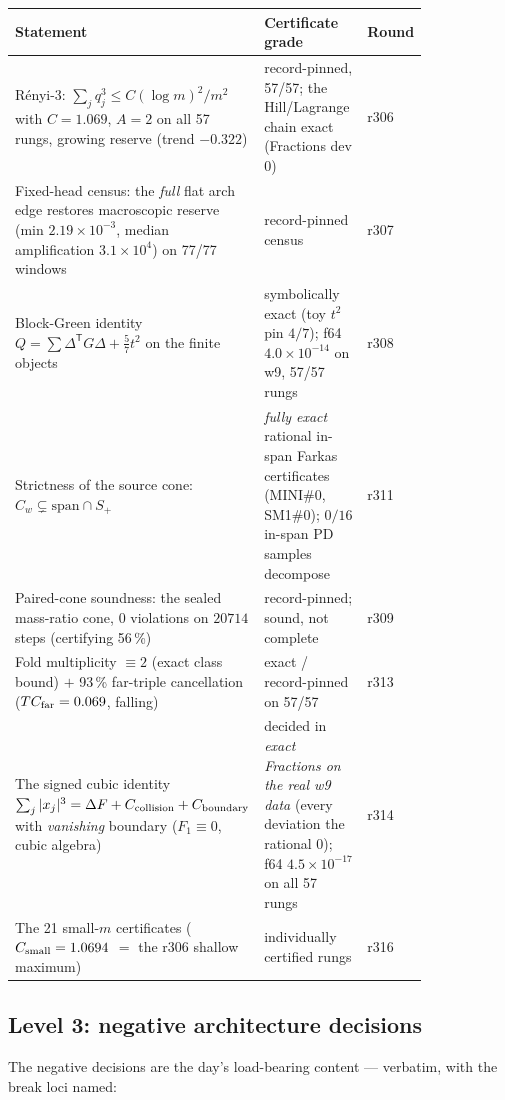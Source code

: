 \documentclass[11pt]{article}
\theoremstyle{definition}
\theoremstyle{remark}
\begin{document}
\begin{center}\small
\begin{tabular}{@{}p{0.44\linewidth}p{0.38\linewidth}l@{}}
\toprule
\textbf{Statement} & \textbf{Certificate grade} & \textbf{Round}\\
\midrule
R\'enyi-3: $\sum_j q_j^3 \le C(\log m)^2/m^2$ with $C = 1.069$,
$A = 2$ on all 57 rungs, growing reserve (trend $-0.322$) &
record-pinned, 57/57; the Hill/Lagrange chain exact (Fractions dev
0) & r306\\
Fixed-head census: the \emph{full} flat arch edge restores
macroscopic reserve (min $2.19\times10^{-3}$, median amplification
$3.1\times10^4$) on 77/77 windows & record-pinned census & r307\\
Block-Green identity $Q = \sum\Delta^{\mathsf T}G\Delta +
\tfrac57 t^2$ on the finite objects & symbolically exact (toy $t^2$
pin $4/7$); f64 $4.0\times10^{-14}$ on w9, 57/57 rungs & r308\\
Strictness of the source cone: $C_w \subsetneq
\mathrm{span}\cap S_+$ & \emph{fully exact} rational in-span Farkas
certificates (MINI\#0, SM1\#0); $0/16$ in-span PD samples decompose
& r311\\
Paired-cone soundness: the sealed mass-ratio cone, $0$ violations
on $20714$ steps (certifying 56\,\%) & record-pinned; sound, not
complete & r309\\
Fold multiplicity $\equiv 2$ (exact class bound) $+$ 93\,\%
far-triple cancellation ($TC_{\rm far} = 0.069$, falling) & exact /
record-pinned on 57/57 & r313\\
The signed cubic identity $\sum_j|x_j|^3 = \Delta F + C_{\rm
collision} + C_{\rm boundary}$ with \emph{vanishing} boundary
($F_1 \equiv 0$, cubic algebra) & decided in \emph{exact Fractions
on the real w9 data} (every deviation the rational 0); f64
$4.5\times10^{-17}$ on all 57 rungs & r314\\
The 21 small-$m$ certificates ($C_{\rm small} = 1.0694$ $=$ the
r306 shallow maximum) & individually certified rungs & r316\\
\bottomrule
\end{tabular}
\end{center}

\subsection{Level 3: negative architecture decisions}

The negative decisions are the day's load-bearing content ---
verbatim, with the break loci named:
\end{document}
